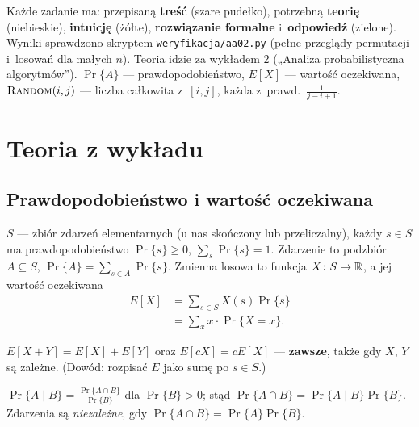 \documentclass[11pt]{article}
\begin{document}

\begin{teoria}
Każde zadanie ma: przepisaną \textbf{treść} (szare pudełko), potrzebną
\textbf{teorię} (niebieskie), \textbf{intuicję} (żółte), \textbf{rozwiązanie
formalne} i~\textbf{odpowiedź} (zielone). Wyniki sprawdzono skryptem
\texttt{weryfikacja/aa02.py} (pełne przeglądy permutacji i~losowań dla małych $n$).
Teoria idzie za wykładem 2 („Analiza probabilistyczna algorytmów”).
$\Pr\{A\}$ --- prawdopodobieństwo, $E[X]$ --- wartość oczekiwana,
$\textsc{Random}(i,j)$ --- liczba całkowita z~$[i,j]$, każda z~prawd.\ $\frac{1}{j-i+1}$.
\end{teoria}

\section{Teoria z wykładu}

\subsection*{Prawdopodobieństwo i wartość oczekiwana}

\begin{definicja}
$S$ --- zbiór zdarzeń elementarnych (u nas skończony lub przeliczalny),
każdy $s\in S$ ma prawdopodobieństwo $\Pr\{s\}\ge0$, $\sum_s\Pr\{s\}=1$.
Zdarzenie to podzbiór $A\subseteq S$, $\Pr\{A\}=\sum_{s\in A}\Pr\{s\}$.
Zmienna losowa to funkcja $X\colon S\to\mathbb{R}$, a jej wartość oczekiwana
\begin{align*}
E[X]&=\sum_{s\in S}X(s)\Pr\{s\}\\
&=\sum_{x}x\cdot\Pr\{X=x\}.
\end{align*}
\end{definicja}

\begin{twierdzenie}\label{tw:lin}
$E[X+Y]=E[X]+E[Y]$ oraz $E[cX]=cE[X]$ --- \textbf{zawsze}, także gdy $X$, $Y$
są zależne. (Dowód: rozpisać $E$ jako sumę po $s\in S$.)
\end{twierdzenie}

\begin{definicja}
$\Pr\{A\mid B\}=\frac{\Pr\{A\cap B\}}{\Pr\{B\}}$ dla $\Pr\{B\}>0$; stąd
$\Pr\{A\cap B\}=\Pr\{A\mid B\}\Pr\{B\}$. Zdarzenia są \emph{niezależne}, gdy
$\Pr\{A\cap B\}=\Pr\{A\}\Pr\{B\}$.
\end{definicja}
\end{document}
